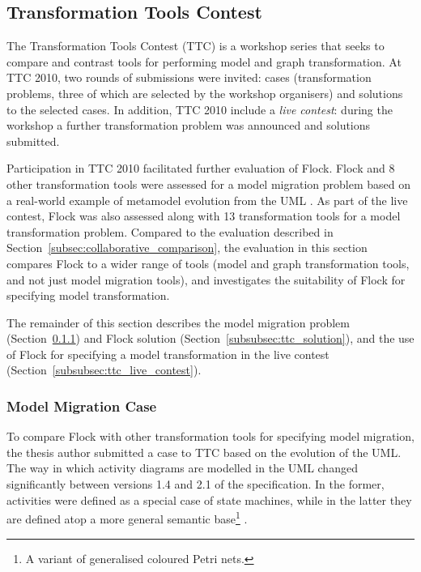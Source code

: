 
\subsection{Transformation Tools Contest}
The Transformation Tools Contest (TTC) is a workshop series that seeks to compare and contrast tools for performing model and graph transformation. At TTC 2010, two rounds of submissions were invited: cases (transformation problems, three of which are selected by the workshop organisers) and solutions to the selected cases. In addition, TTC 2010 include a \emph{live contest}: during the workshop a further transformation problem was announced and solutions submitted.

Participation in TTC 2010 facilitated further evaluation of Flock. Flock and 8 other transformation tools were assessed for a model migration problem based on a real-world example of metamodel evolution from the UML \cite{uml22}. As part of the live contest, Flock was also assessed along with 13 transformation tools for a model transformation problem. Compared to the evaluation described in Section~\ref{subsec:collaborative_comparison}, the evaluation in this section compares Flock to a wider range of tools (model and graph transformation tools, and not just model migration tools), and investigates the suitability of Flock for specifying model transformation.

The remainder of this section describes the model migration problem (Section~\ref{subsubsec:ttc_case}) and Flock solution (Section~\ref{subsubsec:ttc_solution}), and the use of Flock for specifying a model transformation in the live contest (Section~\ref{subsubsec:ttc_live_contest}).

\subsubsection{Model Migration Case}
\label{subsubsec:ttc_case}
To compare Flock with other transformation tools for specifying model migration, the thesis author submitted a case to TTC based on the evolution of the UML. The way in which activity diagrams are modelled in the UML changed significantly between versions 1.4 and 2.1 of the specification. In the former, activities were defined as a special case of state machines, while in the latter they are defined atop a more general semantic base\footnote{A variant of generalised coloured Petri nets.} \cite{selic05uml2}.

